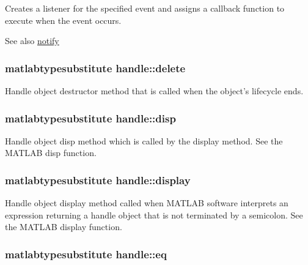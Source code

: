 Creates a listener for the specified event and assigns a callback function to execute when the event occurs. 

\begin{DoxySeeAlso}{See also}
\hyperlink{classhandle_a8cfc3dab9d3ecc55b0b3449c2c7afd6f}{notify} 
\end{DoxySeeAlso}
\hypertarget{classhandle_a1d55d41c7af285b8fe7ab17ed5e176f6}{
\subsubsection[{delete}]{\setlength{\rightskip}{0pt plus 5cm}matlabtypesubstitute {\bf handle\-::delete}}}\label{classhandle_a1d55d41c7af285b8fe7ab17ed5e176f6}


Handle object destructor method that is called when the object's lifecycle ends. 

\hypertarget{classhandle_adedb524cfbdf6a5d946cc57ef6745099}{
\subsubsection[{disp}]{\setlength{\rightskip}{0pt plus 5cm}matlabtypesubstitute {\bf handle\-::disp}}}\label{classhandle_adedb524cfbdf6a5d946cc57ef6745099}


Handle object disp method which is called by the display method. See the M\-A\-T\-L\-A\-B disp function. 

\hypertarget{classhandle_a2e26be32e99b2b98db18bb538638b814}{
\subsubsection[{display}]{\setlength{\rightskip}{0pt plus 5cm}matlabtypesubstitute {\bf handle\-::display}}}\label{classhandle_a2e26be32e99b2b98db18bb538638b814}


Handle object display method called when M\-A\-T\-L\-A\-B software interprets an expression returning a handle object that is not terminated by a semicolon. See the M\-A\-T\-L\-A\-B display function. 

\hypertarget{classhandle_a2fb018cd603a5ced1783bfb20c6cce86}{
\subsubsection[{eq}]{\setlength{\rightskip}{0pt plus 5cm}matlabtypesubstitute {\bf handle\-::eq}}}\label{classhandle_a2fb018cd603a5ced1783bfb20c6cce86}


